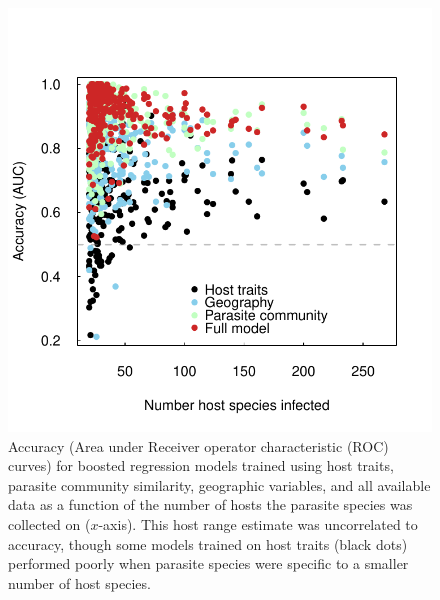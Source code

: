 \documentclass[12pt]{article}
\begin{document}
 
\begin{figure}[h]
  \includegraphics[width=\textwidth]{Figures/hostNumAccuracy.pdf}
  \caption{Accuracy (Area under Receiver operator characteristic (ROC) curves) for boosted regression models trained using host traits, parasite community similarity, geographic variables, and all available data as a function of the number of hosts the parasite species was collected on ($x$-axis). This host range estimate was uncorrelated to accuracy, though some models trained on host traits (black dots) performed poorly when parasite species were specific to a smaller number of host species. }
 \label{fig:HostNum}
 \end{figure}
\end{document}
